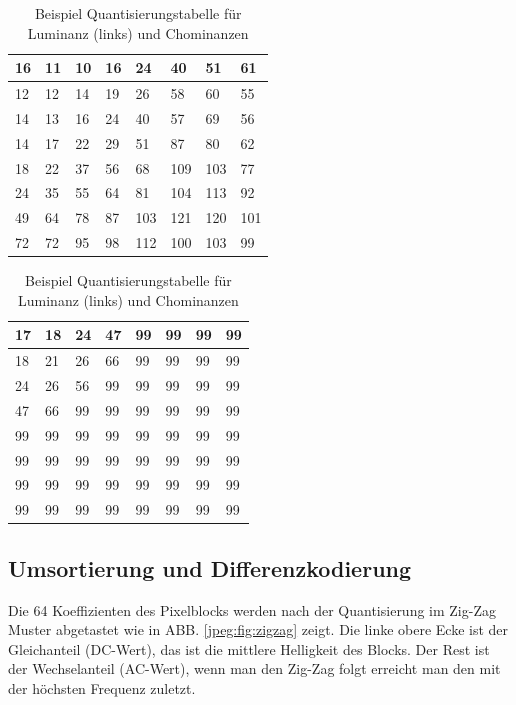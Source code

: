 \begin{table}[b]
    \centering
    \begin{tabularx}{0.47\linewidth}{|X|X|X|X|X|X|X|X|}
        \hline
        16 & 11 & 10 & 16 & 24  & 40 & 51 & 61    \\ \hline
        12 & 12 & 14 & 19 & 26  & 58 & 60 & 55    \\ \hline
        14 & 13 & 16 & 24 & 40  & 57 & 69 & 56    \\ \hline
        14 & 17 & 22 & 29 & 51  & 87 & 80 & 62    \\ \hline
        18 & 22 & 37 & 56 & 68  & 109 & 103 & 77  \\ \hline
        24 & 35 & 55 & 64 & 81  & 104 & 113 & 92  \\ \hline
        49 & 64 & 78 & 87 & 103 & 121 & 120 & 101 \\ \hline
        72 & 72 & 95 & 98 & 112 & 100 & 103 & 99  \\ \hline        
    \end{tabularx}
    \qquad
    \begin{tabularx}{0.47\linewidth}{|X|X|X|X|X|X|X|X|}
        \hline
        17 & 18 & 24 & 47 & 99 & 99 & 99 & 99  \\ \hline
        18 & 21 & 26 & 66 & 99 & 99 & 99 & 99  \\ \hline
        24 & 26 & 56 & 99 & 99 & 99 & 99 & 99  \\ \hline
        47 & 66 & 99 & 99 & 99 & 99 & 99 & 99  \\ \hline
        99 & 99 & 99 & 99 & 99 & 99 & 99 & 99  \\ \hline
        99 & 99 & 99 & 99 & 99 & 99 & 99 & 99  \\ \hline
        99 & 99 & 99 & 99 & 99 & 99 & 99 & 99  \\ \hline
        99 & 99 & 99 & 99 & 99 & 99 & 99 & 99  \\ \hline  	  
    \end{tabularx}
    \caption{Beispiel Quantisierungstabelle für Luminanz (links) und Chominanzen
        \label{jpeg:tab:quant}}
\end{table}



\subsection{Umsortierung und Differenzkodierung
\label{jpeg:subsection:umsortierung}}
Die 64 Koeffizienten des Pixelblocks werden nach der Quantisierung im Zig-Zag Muster abgetastet wie in ABB. \ref{jpeg:fig:zigzag} zeigt.
Die linke obere Ecke ist der Gleichanteil (DC-Wert), das ist die mittlere Helligkeit des Blocks.
Der Rest ist der Wechselanteil (AC-Wert), wenn man den Zig-Zag folgt erreicht man den mit der höchsten Frequenz zuletzt.

